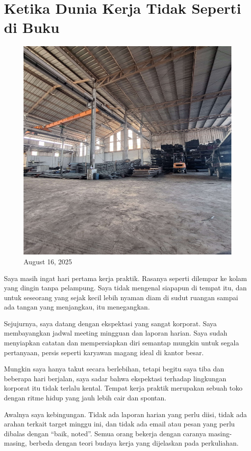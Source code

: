 \documentclass[
  letterpaper,
  DIV=11,
  numbers=noendperiod]{scrreprt}
\begin{document}
\section{Ketika Dunia Kerja Tidak Seperti di
Buku}\label{ketika-dunia-kerja-tidak-seperti-di-buku}

\begin{figure}[H]

{\centering \includegraphics[width=0.5\linewidth,height=\textheight,keepaspectratio]{My_Stories_for_You/../images/gudang.jpg}

}

\caption{August 16, 2025}

\end{figure}%

Saya masih ingat hari pertama kerja praktik. Rasanya seperti dilempar ke
kolam yang dingin tanpa pelampung. Saya tidak mengenal siapapun di
tempat itu, dan untuk seseorang yang sejak kecil lebih nyaman diam di
sudut ruangan sampai ada tangan yang menjangkau, itu menegangkan.

Sejujurnya, saya datang dengan ekspektasi yang sangat korporat. Saya
membayangkan jadwal meeting mingguan dan laporan harian. Saya sudah
menyiapkan catatan dan mempersiapkan diri semantap mungkin untuk segala
pertanyaan, persis seperti karyawan magang ideal di kantor besar.

Mungkin saya hanya takut secara berlebihan, tetapi begitu saya tiba dan
beberapa hari berjalan, saya sadar bahwa ekspektasi terhadap lingkungan
korporat itu tidak terlalu kental. Tempat kerja praktik merupakan sebuah
toko dengan ritme hidup yang jauh lebih cair dan spontan.

Awalnya saya kebingungan. Tidak ada laporan harian yang perlu diisi,
tidak ada arahan terkait target minggu ini, dan tidak ada email atau
pesan yang perlu dibalas dengan ``baik, noted''. Semua orang bekerja
dengan caranya masing-masing, berbeda dengan teori budaya kerja yang
dijelaskan pada perkuliahan.
\end{document}
